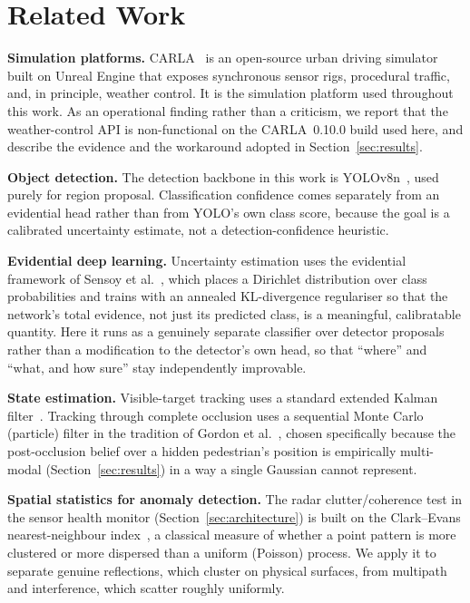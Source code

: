 \documentclass[conference]{IEEEtran}
\begin{document}
\section{Related Work}
\label{sec:related}

\textbf{Simulation platforms.} CARLA~\cite{carla2017} is an open-source
urban driving simulator built on Unreal Engine that exposes synchronous
sensor rigs, procedural traffic, and, in principle, weather control. It
is the simulation platform used throughout this work. As an operational
finding rather than a criticism, we report that the weather-control API
is non-functional on the CARLA~0.10.0 build used here, and describe the
evidence and the workaround adopted in Section~\ref{sec:results}.

\textbf{Object detection.} The detection backbone in this work is
YOLOv8n~\cite{yolo2016}, used purely for region proposal. Classification
confidence comes separately from an evidential head rather than from
YOLO's own class score, because the goal is a calibrated uncertainty
estimate, not a detection-confidence heuristic.

\textbf{Evidential deep learning.} Uncertainty estimation uses the
evidential framework of Sensoy et al.~\cite{sensoy2018}, which places a
Dirichlet distribution over class probabilities and trains with an
annealed KL-divergence regulariser so that the network's total
evidence, not just its predicted class, is a meaningful, calibratable
quantity. Here it runs as a genuinely separate classifier over detector
proposals rather than a modification to the detector's own head, so
that ``where'' and ``what, and how sure'' stay independently
improvable.

\textbf{State estimation.} Visible-target tracking uses a standard
extended Kalman filter~\cite{welch1995}. Tracking through complete
occlusion uses a sequential Monte Carlo (particle) filter in the
tradition of Gordon et al.~\cite{gordon1993}, chosen specifically
because the post-occlusion belief over a hidden pedestrian's position
is empirically multi-modal (Section~\ref{sec:results}) in a way a
single Gaussian cannot represent.

\textbf{Spatial statistics for anomaly detection.} The radar
clutter/coherence test in the sensor health monitor (Section~\ref{sec:architecture})
is built on the Clark--Evans nearest-neighbour index~\cite{clarkevans1954},
a classical measure of whether a point pattern is more clustered or
more dispersed than a uniform (Poisson) process. We apply it to
separate genuine reflections, which cluster on physical surfaces, from
multipath and interference, which scatter roughly uniformly.
\end{document}
